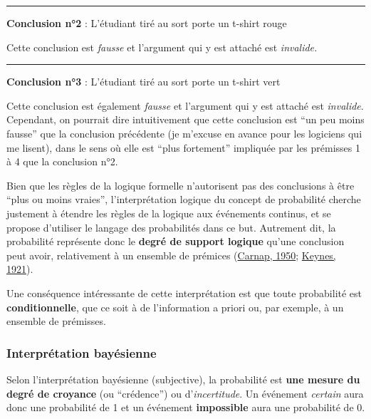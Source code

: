 \documentclass[
  a4paper,11pt,twoside,onecolumn,openright,final,oldfontcommands]{memoir}
\theoremstyle{definition}
\theoremstyle{definition}
\theoremstyle{definition}
\theoremstyle{definition}
\theoremstyle{remark}
\begin{document}
\par

\noindent

\rule{\textwidth}{1pt}

\textbf{Conclusion n°2} : L'étudiant tiré au sort porte un t-shirt rouge

Cette conclusion est \emph{fausse} et l'argument qui y est attaché est \emph{invalide.}

\par

\noindent

\rule{\textwidth}{1pt}

\textbf{Conclusion n°3} : L'étudiant tiré au sort porte un t-shirt vert

Cette conclusion est également \emph{fausse} et l'argument qui y est attaché est \emph{invalide}. Cependant, on pourrait dire intuitivement que cette conclusion est ``un peu moins fausse'' que la conclusion précédente (je m'excuse en avance pour les logiciens qui me lisent), dans le sens où elle est ``plus fortement'' impliquée par les prémisses 1 à 4 que la conclusion n°2.

Bien que les règles de la logique formelle n'autorisent pas des conclusions à être ``plus ou moins vraies'', l'interprétation logique du concept de probabilité cherche justement à étendre les règles de la logique aux événements continus, et se propose d'utiliser le langage des probabilités dans ce but. Autrement dit, la probabilité représente donc le \textbf{degré de support logique} qu'une conclusion peut avoir, relativement à un ensemble de prémices (\protect\hyperlink{ref-carnap_logical_1950}{Carnap, 1950}; \protect\hyperlink{ref-keynes_treatise_1921}{Keynes, 1921}).

Une conséquence intéressante de cette interprétation est que toute probabilité est \textbf{conditionnelle}, que ce soit à de l'information a priori ou, par exemple, à un ensemble de prémisses.

\hypertarget{interpruxe9tation-bayuxe9sienne}{%
\subsubsection{Interprétation bayésienne}\label{interpruxe9tation-bayuxe9sienne}}

Selon l'interprétation bayésienne (subjective), la probabilité est \textbf{une mesure du degré de croyance} (ou ``crédence'') ou d'\emph{incertitude}. Un événement \emph{certain} aura donc une probabilité de 1 et un événement \textbf{impossible} aura une probabilité de 0.
\end{document}
